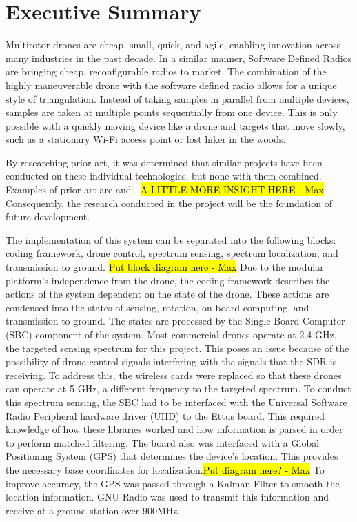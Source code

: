 \chapter*{Executive Summary}
Multirotor drones are cheap, small, quick, and agile, enabling innovation across many industries in the past decade. In a similar manner, Software Defined Radios are bringing cheap, reconfigurable radios to market. The combination of the highly maneuverable drone with the software defined radio allows for a unique style of triangulation. Instead of taking samples in parallel from multiple devices, samples are taken at multiple points sequentially from one device. This is only possible with a quickly moving device like a drone and targets that move slowly, such as a stationary Wi-Fi access point or lost hiker in the woods. \par

By researching prior art, it was determined that similar projects have been conducted on these individual technologies, but none with them combined. Examples of prior art are \cite{path_planning_snr_mqp} and \cite{sdr_localization_mqp}. \hl{A LITTLE MORE INSIGHT HERE - Max} Consequently, the research conducted in the project will be the foundation of future development. \par

The implementation of this system can be separated into the following blocks: coding framework, drone control, spectrum sensing, spectrum localization, and transmission to ground. \hl{Put block diagram here - Max} Due to the modular platform's independence from the drone, the coding framework describes the actions of the system dependent on the state of the drone. These actions are condensed into the states of sensing, rotation, on-board computing, and transmission to ground. The states are processed by the Single Board Computer (SBC) component of the system. Most commercial drones operate at 2.4 GHz, the targeted sensing spectrum for this project. This poses an issue because of the possibility of drone control signals interfering with the signals that the SDR is receiving. To address this, the wireless cards were replaced so that these drones can operate at 5 GHz, a different frequency to the targeted spectrum. To conduct this spectrum sensing, the SBC had to be interfaced with the Universal Software Radio Peripheral hardware driver (UHD) to the Ettus board. This required knowledge of how these libraries worked and how information is parsed in order to perform matched filtering. The board also was interfaced with a Global Positioning System (GPS) that determines the device's location. This provides the necessary base coordinates for localization.\hl{Put diagram here? - Max} To improve accuracy, the GPS was passed through a Kalman Filter to smooth the location information. GNU Radio was used to transmit this information and receive at a ground station over 900MHz. \par 

